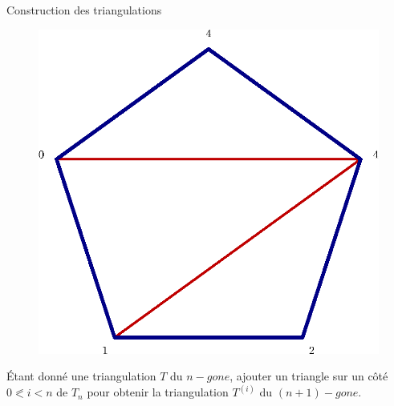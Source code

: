 \documentclass[french,xcolor=dvipsnames]{beamer}
\begin{document}
\begin{frame}{Construction des triangulations}
\begin{figure}
				\includegraphics[scale=0.2]{triangu_5.eps}
			\end{figure}
			Étant donné une triangulation $T$ du $n-gone$, ajouter un triangle sur un côté $0 \eqslantless i < n$ de $T_{n}$ pour obtenir la triangulation $T^{(i)}$ du $(n+1)-gone$.
		\end{frame}
\end{document}
